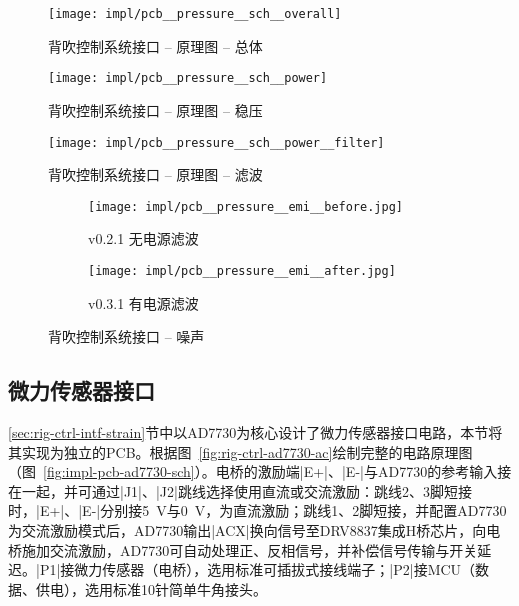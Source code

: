 \begin{figure}[tbhp]
\centering
\texttt{[image: impl/pcb\_\_pressure\_\_sch\_\_overall]}
\caption{背吹控制系统接口 -- 原理图 -- 总体}
\label{fig:impl-pcb-pressure-sch-overall}
\end{figure}

\begin{figure}[tbhp]
\centering
\texttt{[image: impl/pcb\_\_pressure\_\_sch\_\_power]}
\caption{背吹控制系统接口 -- 原理图 -- 稳压}
\label{fig:impl-pcb-pressure-sch-power}
\end{figure}

\begin{figure}[p]
\centering
\texttt{[image: impl/pcb\_\_pressure\_\_sch\_\_power\_\_filter]}
\caption{背吹控制系统接口 -- 原理图 -- 滤波}
\label{fig:impl-pcb-pressure-sch-power-filter}
\end{figure}

\begin{figure}[p]
  \centering
  \begin{subfigure}{1\textwidth}
    \centering
    \texttt{[image: impl/pcb\_\_pressure\_\_emi\_\_before.jpg]}
    \caption{v0.2.1 无电源滤波}
    \label{fig:impl-pcb-pressure-emi-before}
  \end{subfigure}
  \begin{subfigure}{1\textwidth}
    \centering
    \texttt{[image: impl/pcb\_\_pressure\_\_emi\_\_after.jpg]}
    \caption{v0.3.1 有电源滤波}
    \label{fig:impl-pcb-pressure-emi-after}
  \end{subfigure}
\caption{背吹控制系统接口 -- 噪声}
\label{fig:impl-pcb-pressure-emi}
\end{figure}


\clearpage


\subsection{微力传感器接口}\label{sec:impl-pcb-ad7730}

\ref{sec:rig-ctrl-intf-strain}节中以AD7730为核心设计了微力传感器接口电路，本节将其实现为独立的PCB。根据图~\ref{fig:rig-ctrl-ad7730-ac}绘制完整的电路原理图（图~\ref{fig:impl-pcb-ad7730-sch}）。电桥的激励端\bverb|E+|、\bverb|E-|与AD7730的参考输入接在一起，并可通过\bverb|J1|、\bverb|J2|跳线选择使用直流或交流激励：跳线2、3脚短接时，\bverb|E+|、\bverb|E-|分别接\SI{+5}{\V}与\SI{0}{\V}，为直流激励；跳线1、2脚短接，并配置AD7730为交流激励模式后，AD7730输出\bverb|ACX|换向信号至DRV8837集成H桥芯片，向电桥施加交流激励，AD7730可自动处理正、反相信号，并补偿信号传输与开关延迟。\bverb|P1|接微力传感器（电桥），选用标准可插拔式接线端子；\bverb|P2|接MCU（数据、供电），选用标准10针简单牛角接头。

